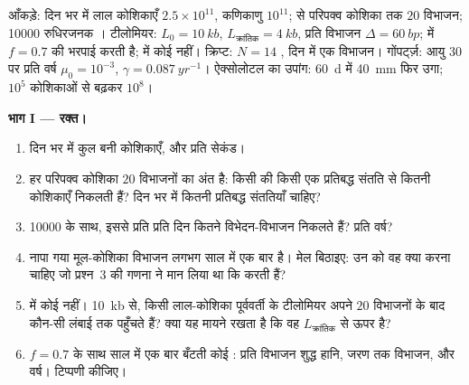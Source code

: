 \begin{problem}
\label{pb:b3:stem-cells:1}
आँकड़े: दिन भर में लाल कोशिकाएँ $2.5\times 10^{11}$, कणिकाणु
$10^{11}$;  से परिपक्व कोशिका तक $20$ विभाजन; \num{10000}
रुधिरजनक । टीलोमियर: $L_{0} = \qty{10}{kb}$,
$L_{\text{क्रांतिक}} = \qty{4}{kb}$, प्रति विभाजन $\Delta = \qty{60}{bp}$;
 में  $f = 0.7$ की भरपाई करती है;  में
कोई नहीं। क्रिप्ट: $N = 14$ , दिन में एक विभाजन।
गोंपर्ट्ज़: आयु 30 पर प्रति वर्ष $\mu_{0} =
10^{-3}$, $\gamma = \qty{0.087}{yr^{-1}}$। ऐक्सोलोटल का उपांग:
\qty{60}{d} में \qty{40}{mm} फिर उगा;  $10^{5}$ कोशिकाओं से
बढ़कर $10^{8}$।

\medskip
\noindent\textbf{भाग I --- रक्त।}
\begin{enumerate}
  \item दिन भर में कुल बनी कोशिकाएँ, और प्रति सेकंड।
  \item हर परिपक्व कोशिका $20$ विभाजनों का अंत है: किसी  की
        किसी एक प्रतिबद्ध संतति से कितनी कोशिकाएँ निकलती हैं? दिन भर
        में कितनी प्रतिबद्ध संततियाँ चाहिए?
  \item \num{10000}  के साथ, इससे प्रति  प्रति
        दिन कितने विभेदन-विभाजन निकलते हैं? प्रति वर्ष?
  \item नापा गया मूल-कोशिका विभाजन लगभग साल में एक बार है। मेल बिठाइए:
        उन  को वह क्या करना चाहिए जो प्रश्न~3 की गणना ने
        मान लिया था कि  करती हैं?
  \item {} में कोई  नहीं। \qty{10}{kb} से, किसी
        लाल-कोशिका पूर्ववर्ती के टीलोमियर अपने $20$ विभाजनों के बाद
        कौन-सी लंबाई तक पहुँचते हैं? क्या यह मायने रखता है कि वह
        $L_{\text{क्रांतिक}}$ से ऊपर है?
  \item $f = 0.7$ के साथ साल में एक बार बँटती कोई : प्रति
        विभाजन शुद्ध हानि, जरण तक विभाजन, और वर्ष। टिप्पणी कीजिए।
\end{enumerate}


\end{problem}
